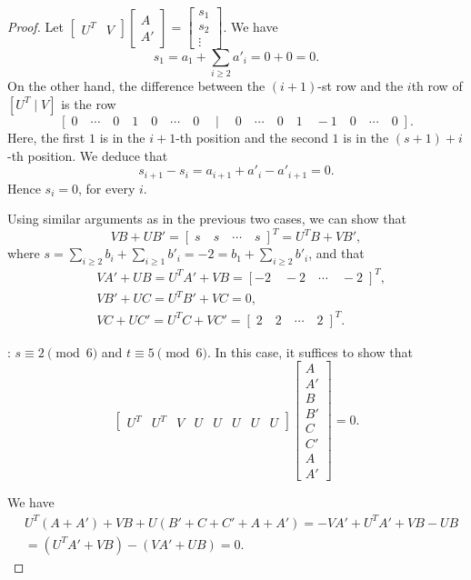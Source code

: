 \documentclass[11pt,a4paper]{amsart}
\theoremstyle{definition}
\DeclareMathOperator{\C}{\mathbb{C}}
\numberwithin{equation}{section}
\newcommand{\A}{\mathbb{A}}
\newcommand{\s}{\text{ss}}
\begin{document}
\begin{proof}
Let $\begin{bmatrix}
    U^T & V 
\end{bmatrix} \begin{bmatrix}
    A\\A'
\end{bmatrix}=\begin{bmatrix}s_1\\s_2\\\vdots\end{bmatrix}$. We have
\[
s_1=a_1+ \sum_{i\geq 2}a'_i= 0+0=0.
\]
On the other hand, the difference between the $(i+1)$-st row and the $i$th row of $[U^T \mid V]$ is the row
\[
\left [\; 0\quad \cdots\quad 0 \quad 1  \quad 0\quad\cdots \quad 0\quad \mid\quad  0\quad\cdots \quad 0 \quad  1\quad -1\quad 0\quad\cdots \quad 0\;\right].
\]
Here, the first $1$ is in the $i+1$-th position and the second $1$ is in the $(s+1)+i$-th position. We deduce that
\[
s_{i+1}-s_i=a_{i+1}+a'_i-a'_{i+1}=0.
\]
Hence $s_i=0$, for every $i$.

Using  similar arguments as in the previous two cases, we can show that
\[
VB+UB'= [\;s \quad s\quad\cdots\quad s\;]^T= U^TB+VB',
\]
where $s=\sum_{i\geq 2}b_i+ \sum_{i\geq 1}b'_i=-2=b_1+ \sum_{i\geq 2}b'_i$, and that
\[
\begin{aligned}
&VA'+UB=U^TA'+VB=[-2\quad -2\quad \cdots \quad -2\;]^T,\\
&VB'+UC= U^TB'+VC=0, \\
&VC+UC'=U^TC+VC'=[\;2\quad 2\quad \cdots \quad 2\;]^T.   
\end{aligned}
\]



\medskip
{}: $s\equiv 2\pmod 6$ and $t\equiv 5\pmod 6$. In this case, it suffices to show that \[\begin{bmatrix}
    U^T & U^T & V & U & U & U&U&U 
\end{bmatrix} \begin{bmatrix}
    A\\A'\\B\\B'\\C\\C'\\A\\A'
\end{bmatrix}=0.\]

We have
\[
\begin{aligned}
   &U^T(A+A')+VB+U(B'+C+C'+A+A')=-VA'+U^TA' +VB-UB \\
   &= (U^TA'+VB)-(VA'+UB)=0.
\end{aligned}
\]


\end{proof}
\end{document}
